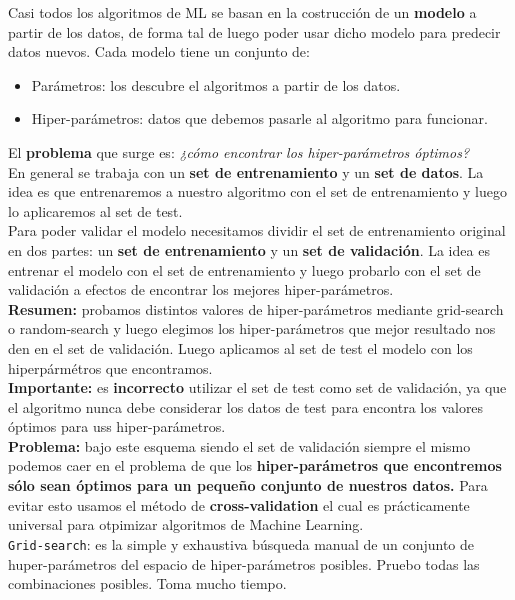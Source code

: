 \documentclass[titlepage,a4paper]{article}
\begin{document}
Casi todos los algoritmos de ML se basan en la costrucción de un \textbf{modelo} a partir de los datos, de forma tal de luego poder usar dicho modelo para predecir datos nuevos. Cada modelo tiene un conjunto de: 
\begin{itemize}
\item Parámetros: los descubre el algoritmos  a partir de los datos. 
\item Hiper-parámetros: datos que debemos pasarle al algoritmo para funcionar. 
\end{itemize}

El \textbf{problema} que surge es: \textit{¿cómo encontrar los hiper-parámetros óptimos? }\\

En general se trabaja con un \textbf{set de entrenamiento} y un \textbf{set de datos}.  La idea es que entrenaremos a nuestro algoritmo con el set de entrenamiento y luego lo aplicaremos al set de test. \\

Para poder validar el modelo necesitamos dividir el set de entrenamiento original en dos partes: un \textbf{set de entrenamiento} y un \textbf{set de validación}. La idea es entrenar el modelo con el set de entrenamiento y luego probarlo con el set de validación a efectos de encontrar los mejores hiper-parámetros. \\

\textbf{Resumen:} probamos distintos valores de hiper-parámetros mediante grid-search o random-search y luego elegimos los hiper-parámetros que mejor resultado nos den en el set de validación. Luego aplicamos al set de test el modelo con los hiperpármétros que encontramos. \\

\textbf{Importante: } es \textbf{incorrecto} utilizar el set de test como set de validación, ya que el algoritmo nunca debe considerar los datos de test para encontra los valores óptimos para uss hiper-parámetros. \\

\textbf{Problema:} bajo este esquema siendo el set de validación siempre el mismo podemos caer en el problema de que los \textbf{hiper-parámetros que encontremos sólo sean óptimos para un pequeño conjunto de nuestros datos. } Para evitar esto usamos el método de \textbf{cross-validation} el cual es prácticamente universal para otpimizar algoritmos de Machine Learning. \\

\texttt{Grid-search}: es la simple y exhaustiva búsqueda manual de un conjunto de huper-parámetros del espacio de hiper-parámetros posibles. Pruebo todas las combinaciones posibles. Toma mucho tiempo. \\
\end{document}
